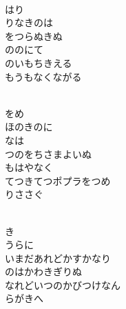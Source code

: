 \documentclass[10pt,b5j]{tarticle} %
\begin{document}
\vspace{1.5em} %
\newcommand{\linespace}{0.5em} %
\newcommand{\blocksize}{0.5\hsize} %
\newcommand{\itemmargin}{6em} %
\begin{enumerate} %
    \setlength{\itemindent}{\itemmargin} %
    \begin{minipage}[c]{\blocksize}
    
        \vspace{\linespace}
        \item~\\
        はり\\
        りなきのは\\
        をつらぬきぬ\\
        ののにて\\
        のいもちきえる\\
        もうもなくながる
        
        \vspace{\linespace}
        \item~\\
        をめ\\
        ほのきのに\\
        なは\\
        つのをちさまよいぬ\\
        もはやなく\\
        てつきてつポプラをつめ\\
        りささぐ
        
        \vspace{\linespace}
        \item~\\
        き\\
        うらに\\
        いまだあれどかすかなり\\
        のはかわきぎりぬ\\
        なれどいつのかびつけなん\\
        らがきへ
        

\end{minipage}
\end{enumerate}
\end{document}
